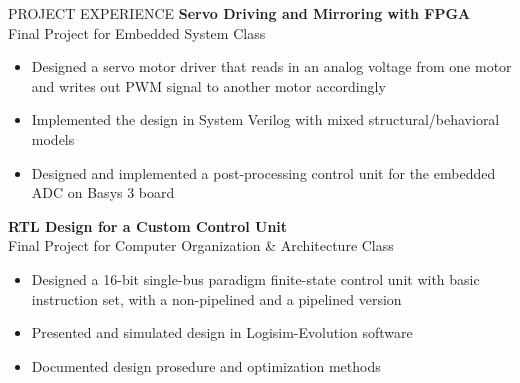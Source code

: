 \documentclass{../lib/resume} %
\begin{document}

    \begin{rSection}{PROJECT EXPERIENCE}
        \textbf{Servo Driving and Mirroring with FPGA} \\
        Final Project for Embedded System Class
        \begin{itemize}
            \itemsep -4pt {}
            \item Designed a servo motor driver that reads in an analog voltage from one motor and writes out PWM signal to another motor accordingly
            \item Implemented the design in System Verilog with mixed structural/behavioral models
            \item Designed and implemented a post-processing control unit for the embedded ADC on Basys 3 board
        \end{itemize}

        \textbf{RTL Design for a Custom Control Unit} \\
        Final Project for Computer Organization \& Architecture Class
        \begin{itemize}
            \itemsep -4pt {}
            \item Designed a 16-bit single-bus paradigm finite-state control unit with basic instruction set, with a non-pipelined and a pipelined version
            \item Presented and simulated design in Logisim-Evolution software
            \item Documented design prosedure and optimization methods
        \end{itemize}


    \end{rSection}

%
%
%
%
%
\end{document}
